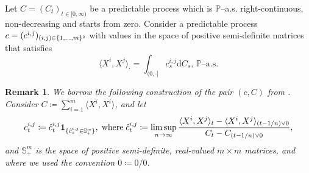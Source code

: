 \documentclass[10pt]{article} %
\newtheorem{remark}[theorem]{Remark}
\newcommand{\smalltext}[1]{\text{\fontsize{4}{4}\selectfont$#1$}}
\def \P{\mathbb{P}}
\def \S{\mathbb{S}}
\def\d{\mathrm{d}}
\begin{document}
\medskip
Let $C = (C_t)_{t \in [0,\infty)}$ be a predictable process which is $\P$--a.s. right-continuous, non-decreasing and starts from zero. Consider a predictable process $c = (c^{i,j})_{(i,j) \in \{1,\ldots,m\}^\smalltext{2}}$ with values in the space of positive semi-definite matrices that satisfies
\begin{equation}\label{eq::dis_x_circ}
	\langle X^i, X^j \rangle_\cdot = \int_{(0,\cdot]} c^{i,j}_s \d C_s, \, \text{$\P$--a.s.}
\end{equation}

\begin{remark}
	We borrow the following construction of the pair $(c,C)$ from {\rm\cite{nutz2015robust}}. Consider $C \coloneqq \sum_{i = 1}^m \langle X^i, X^i \rangle$, and let
	\begin{equation*}
		c^{i,j}_t \coloneqq \hat c^{i,j}_t \mathbf{1}_{\{\hat c^{i,j}_s \in \S^\smalltext{m}_\smalltext{+}\}}, \; \text{\rm where} \; \hat c^{i,j}_t \coloneqq \limsup_{n \rightarrow \infty} \frac{\langle X^i,X^j \rangle_t - \langle X^i,X^j\rangle_{(t-1/n)\lor 0}}{C_t - C_{(t-1/n) \lor 0}},
	\end{equation*}
	and $\S^m_+$ is the space of positive semi-definite, real-valued $m \times m$ matrices, and where we used the convention $0 \coloneqq 0 / 0$.
\end{remark}
\end{document}
